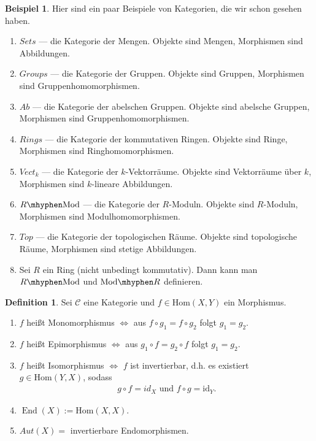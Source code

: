 \documentclass[reqno,12pt]{article}
\numberwithin{equation}{section}
\newcommand{\cC}{\mathcal{C}}
\newcommand{\id}{\text{id}}
\newcommand{\Hom}{\text{Hom}}
\theoremstyle{plain}
\theoremstyle{definition}
\newtheorem{definition}[thm]{Definition}
\newtheorem{example}[thm]{Beispiel}
\newcommand{\End}{\operatorname{End}}
\newcommand{\Mod}{\text{Mod}}
\begin{document}
\begin{example}
Hier sind ein paar Beispiele von Kategorien, die wir schon gesehen haben.
\begin{enumerate}
  \item $Sets$ --- die Kategorie der Mengen. Objekte sind Mengen, Morphismen sind Abbildungen.
  \item $Groups$  --- die Kategorie der Gruppen. Objekte sind Gruppen, Morphismen sind Gruppenhomomorphismen.
  \item $Ab$ --- die Kategorie der abelschen Gruppen. Objekte sind abelsche Gruppen, Morphismen sind Gruppenhomomorphismen.
  \item $Rings$ --- die Kategorie der kommutativen Ringen. Objekte sind Ringe, Morphismen sind Ringhomomorphismen.
  \item $Vect_k$ --- die Kategorie der $k$-Vektorräume. Objekte sind Vektorräume über $k$, Morphismen sind $k$-lineare Abbildungen.
  \item $R \mhyphen \Mod$ --- die Kategorie der $R$-Moduln. Objekte sind $R$-Moduln, Morphismen sind Modulhomomorphismen.
  \item $Top$ --- die Kategorie der topologischen Räume. Objekte sind topologische Räume, Morphismen sind stetige Abbildungen.
  \item Sei $R$ ein Ring (nicht unbedingt kommutativ). Dann kann man $R \mhyphen \Mod$ und $\Mod \mhyphen R$ definieren.
\end{enumerate}
\end{example}

\begin{definition}
Sei $\cC$ eine Kategorie und $f \in \Hom(X,Y)$ ein Morphismus.
\begin{enumerate}
  \item $f$ heißt {\sf Monomorphismus} $\iff$ aus $f \circ g_1 = f \circ g_2$ folgt $g_1 = g_2$.
  \item $f$ heißt {\sf Epimorphismus} $\iff$ aus $g_1 \circ f = g_2 \circ f$ folgt $g_1 = g_2$.
  \item $f$ heißt {\sf Isomorphismus} $\iff$ $f$ ist invertierbar, d.h. es existiert $g \in \Hom(Y,X)$, sodass
  \begin{align*}
  g \circ f = id_X \text{  und  } f \circ g = \id_Y.
  \end{align*}

  \item $\End(X):= \Hom (X,X)$.
  \item $Aut(X)=$  invertierbare Endomorphismen.
\end{enumerate}
\end{definition}
\end{document}
